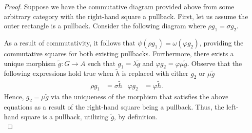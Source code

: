 \documentclass[ 12pt ]{article}
\begin{document}
\begin{enumerate}
		\begin{proof}
			Suppose we have the commutative diagram provided above from some arbitrary category with the right-hand square a pullback. First, let us assume the outer rectangle is a pullback. Consider the following diagram where $\rho g_1 = \sigma g_2$.
			\begin{center}
			\end{center}
			As a result of commutativity, it follows that $\psi (\rho g_1) = \omega (\varphi g_2)$, providing the commutative squares for both existing pullbacks. Furthermore, there exists a unique morphism $\widetilde{g} : G \to A$ such that $g_1 = \lambda \widetilde{g}$ and $\varphi g_2 = \varphi \mu \widetilde{g}$. Observe that the following expressions hold true when $\widetilde{h}$ is replaced with either $g_2$ or $\mu \widetilde{g}$
			\begin{align*}
				\rho g_1 &= \sigma \widetilde{h} & \varphi g_2 &= \varphi \widetilde{h}.
			\end{align*}
			Hence, $g_2 = \mu \widetilde{g}$ via the uniqueness of the morphism that satisfies the above equations as a result of the right-hand square being a pullback. Thus, the left-hand square is a pullback, utilizing $\widetilde{g}$, by definition. \\


\end{proof}
\end{enumerate}
\end{document}
